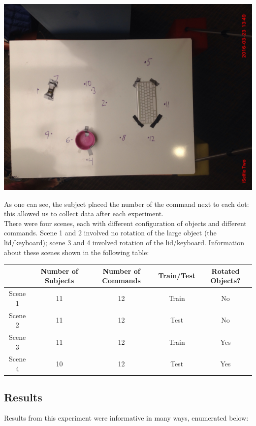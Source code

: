 \documentclass[12pt,letterpaper]{article}
\newcommand\tab[1][1cm]{\hspace*{#1}}
\begin{document}
\includegraphics[scale=.1]{"images/scene1"}

As one can see, the subject placed the number of the command next to each dot: this allowed us to collect data after each experiment.\\ 
\tab There were four scenes, each with different configuration of objects and different commands. Scene 1 and 2 involved no rotation of the large object (the lid/keyboard); scene 3 and 4 involved rotation of the lid/keyboard. Information about these scenes shown in the following table:\\

\begin{tabular}{c c c c c}

 & Number of Subjects & Number of Commands & Train/Test & Rotated Objects?\\
\hline
Scene 1 & 11 & 12 & Train & No\\
Scene 2 & 11 & 12 & Test & No\\
Scene 3 & 11 & 12 & Train & Yes\\
Scene 4 & 10 & 12 & Test & Yes
\end{tabular}


\subsection{Results}

Results from this experiment were informative in many ways, enumerated below:
\end{document}
